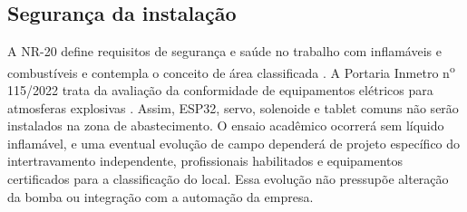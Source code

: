 \subsection{Segurança da instalação}

A NR-20 define requisitos de segurança e saúde no trabalho com inflamáveis e
combustíveis e contempla o conceito de área classificada \cite{nr20}. A Portaria
Inmetro n\textsuperscript{o} 115/2022 trata da avaliação da conformidade de equipamentos elétricos
para atmosferas explosivas \cite{inmetro1152022}. Assim, ESP32, servo, solenoide
e tablet comuns não serão instalados na zona de abastecimento. O ensaio acadêmico
ocorrerá sem líquido inflamável, e uma eventual evolução de campo dependerá de
projeto específico do intertravamento independente, profissionais habilitados e
equipamentos certificados para a classificação do local. Essa evolução não
pressupõe alteração da bomba ou integração com a automação da empresa.
